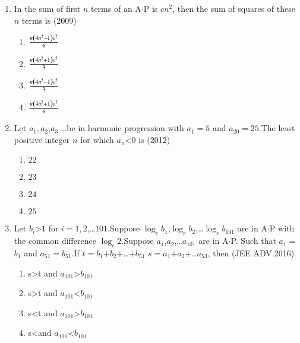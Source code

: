 \documentclass[journal,12pt,twocolumn]{IEEEtran}
\theoremstyle{remark}
\begin{document}
\begin{enumerate} [start=5]
    \item In the sum of first $n$ terms of an A$\cdot$P is $cn^2$, then the sum of squares of these $n$  terms is 
    \hfill(2009)
    \begin{enumerate}
        \item $\frac{n\left(4n^2-1\right)c^2}{6}$
        \item $\frac{n\left(4n^2+1\right)c^2}{3}$
        \item $\frac{n\left(4n^2-1\right)c^2}{3}$
        \item $\frac{n\left(4n^2+1\right)c^2}{6}$
    \end{enumerate}
    \item Let $a_{1}$$,a_{2}$,$a_{3}$ \dots be in harmonic progression with $a_{1}$$=$$5$ and $a_{20}$$=$$25$.The least positive integer $n$ for which $a_{n}$\textless$0$ is
    \hfill(2012)
    \begin{enumerate}
        \item $22$
        \item $23$
        \item $24$
        \item $25$
    \end{enumerate}
    \item Let $b_{i}$\textgreater$1$ for $i$$=$$1,2$,\dots$101$.Suppose $\log_eb_{1}$,$\log_eb_{2}$,\dots$\log_eb_{101}$ are in A$\cdot$P with the common difference $\log_e2$.Suppose $a_{1}$,$a_{2}$,\dots$a_{101}$ are in A$\cdot$P. Such that $a_{1}$$=$ $b_{1}$ and $a_{51}$$=$$b_{51}$.If $t$$=$$b_{1}$$+$$b_{2}$$+$\dots$+$$ b_{51}$ $s$$=$$a_{1}$$+$$a_{2}$$+$\dots$a_{53}$, then 
    \hfill(JEE ADV.2016)
    \begin{enumerate}
        \item s\textgreater t and $a_{101}$\textgreater$b_{101}$
        \item s\textgreater t and $a_{101}$\textless$b_{101}$
        \item s\textless t and $a_{101}$\textgreater$b_{101}$
        \item s\textless and $a_{101}$\textless$b_{101}$
    \end{enumerate}
    
\end{enumerate}




    
\end{document}
